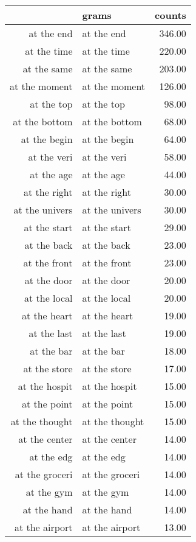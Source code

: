 \begin{table}[ht]
\centering
\begin{tabular}{rlr}
  \hline
 & grams & counts \\ 
  \hline
at the end & at the end & 346.00 \\ 
  at the time & at the time & 220.00 \\ 
  at the same & at the same & 203.00 \\ 
  at the moment & at the moment & 126.00 \\ 
  at the top & at the top & 98.00 \\ 
  at the bottom & at the bottom & 68.00 \\ 
  at the begin & at the begin & 64.00 \\ 
  at the veri & at the veri & 58.00 \\ 
  at the age & at the age & 44.00 \\ 
  at the right & at the right & 30.00 \\ 
  at the univers & at the univers & 30.00 \\ 
  at the start & at the start & 29.00 \\ 
  at the back & at the back & 23.00 \\ 
  at the front & at the front & 23.00 \\ 
  at the door & at the door & 20.00 \\ 
  at the local & at the local & 20.00 \\ 
  at the heart & at the heart & 19.00 \\ 
  at the last & at the last & 19.00 \\ 
  at the bar & at the bar & 18.00 \\ 
  at the store & at the store & 17.00 \\ 
  at the hospit & at the hospit & 15.00 \\ 
  at the point & at the point & 15.00 \\ 
  at the thought & at the thought & 15.00 \\ 
  at the center & at the center & 14.00 \\ 
  at the edg & at the edg & 14.00 \\ 
  at the groceri & at the groceri & 14.00 \\ 
  at the gym & at the gym & 14.00 \\ 
  at the hand & at the hand & 14.00 \\ 
  at the airport & at the airport & 13.00 \\ 

\end{tabular}
\end{table}
